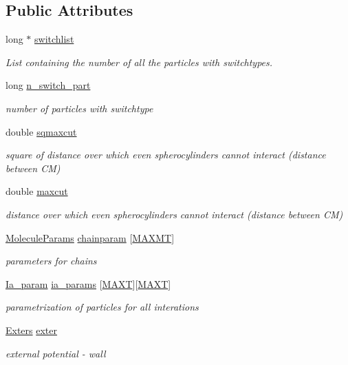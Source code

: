 \subsection*{Public Attributes}
\begin{DoxyCompactItemize}
\item 
long $\ast$ \hyperlink{class_topo_a0ecb4fc994f31c3d02d78b150df71057}{switchlist}
\begin{DoxyCompactList}\small\item\em List containing the number of all the particles with switchtypes. \end{DoxyCompactList}\item 
long \hyperlink{class_topo_a2df8a376cf0d57fba8b5a2513aafcd40}{n\+\_\+switch\+\_\+part}
\begin{DoxyCompactList}\small\item\em number of particles with switchtype \end{DoxyCompactList}\item 
double \hyperlink{class_topo_a1f0ab42bb23e360ab07bb5439689b5f1}{sqmaxcut}
\begin{DoxyCompactList}\small\item\em square of distance over which even spherocylinders cannot interact (distance between C\+M) \end{DoxyCompactList}\item 
double \hyperlink{class_topo_a5058af2ecbcdeb4282e1626198e28c42}{maxcut}
\begin{DoxyCompactList}\small\item\em distance over which even spherocylinders cannot interact (distance between C\+M) \end{DoxyCompactList}\item 
\hyperlink{class_molecule_params}{Molecule\+Params} \hyperlink{class_topo_ac3296661cc431777fb03e8ff3d2129ee}{chainparam} \mbox{[}\hyperlink{macros_8h_ad002a98462c90c52983b122ab9e2059a}{M\+A\+X\+M\+T}\mbox{]}
\begin{DoxyCompactList}\small\item\em parameters for chains \end{DoxyCompactList}\item 
\hyperlink{class_ia__param}{Ia\+\_\+param} \hyperlink{class_topo_a1e4ad27565a7c682ab00ad9791d06e71}{ia\+\_\+params} \mbox{[}\hyperlink{macros_8h_a3f79fdecc884eb98c97d1bdc77455295}{M\+A\+X\+T}\mbox{]}\mbox{[}\hyperlink{macros_8h_a3f79fdecc884eb98c97d1bdc77455295}{M\+A\+X\+T}\mbox{]}
\begin{DoxyCompactList}\small\item\em parametrization of particles for all interations \end{DoxyCompactList}\item 
\hyperlink{class_exters}{Exters} \hyperlink{class_topo_ac95b97650335d237d33f1da999db43ae}{exter}
\begin{DoxyCompactList}\small\item\em external potential -\/ wall \end{DoxyCompactList}\end{DoxyCompactItemize}


